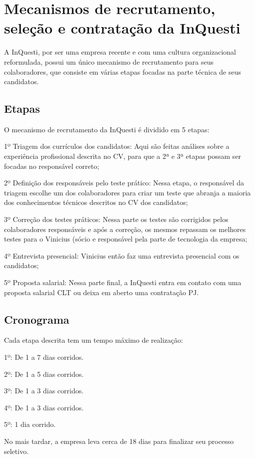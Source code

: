 \chapter{Mecanismos de recrutamento, seleção e contratação da InQuesti}
A InQuesti, por ser uma empresa recente e com uma cultura organizacional reformulada, possui um único mecanismo de recrutamento para seus colaboradores, que consiste em várias etapas focadas na parte técnica de seus candidatos.

\section{Etapas}
O mecanismo de recrutamento da InQuesti é dividido em 5 etapas:

1º Triagem dos currículos dos candidatos: Aqui são feitas análises sobre a experiência profissional
 descrita no CV, para que a 2ª e 3ª etapas possam ser focadas no responsável correto;

2º Definição dos responsáveis pelo teste prático: Nessa etapa, o responsável da triagem escolhe um dos colaboradores para criar um teste que abranja a maioria dos conhecimentos técnicos descritos no CV dos candidatos;

3º Correção dos testes práticos: Nessa parte os testes são corrigidos pelos colaboradores responsáveis e após a correção, os mesmos repassam os melhores testes para o Vinicius (sócio e responsável pela parte de tecnologia da empresa;

4º Entrevista presencial: Vinicius então faz uma entrevista presencial com os candidatos;

5º Proposta salarial: Nessa parte final, a InQuesti entra em contato com uma proposta salarial CLT ou deixa em aberto uma contratação PJ.

\section{Cronograma}
Cada etapa descrita tem um tempo máximo de realização:

1º: De 1 a 7 dias corridos.

2º: De 1 a 5 dias corridos.

3º: De 1 a 3 dias corridos.

4º: De 1 a 3 dias corridos.

5º: 1 dia corrido.

No mais tardar, a empresa leva cerca de 18 dias para finalizar seu processo seletivo.
